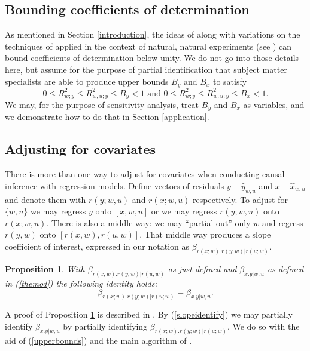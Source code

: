 \documentclass[11pt]{amsart}
\newtheorem{proposition}[theorem]{Proposition}
\begin{document}
\subsection{Bounding coefficients of determination}
As mentioned in Section \ref{introduction}, the ideas of \citep{Gill2014} along with variations on the techniques of \citep{Knaeble2023,Knaeble2024,10.48550/arxiv.2407.19057} applied in the context of natural, natural experiments (see \cite{Rosen}) can bound coefficients of determination below unity. We do not go into those details here, but assume for the purpose of partial identification that subject matter specialists are able to produce upper bounds $B_y$ and $B_x$ to satisfy
\begin{equation}
\label{upperbounds}
0\leq R^2_{w;y}\leq R^2_{w,u;y}\leq B_y<1 \textrm{~and~} 0\leq R^2_{w;y}\leq R^2_{w,u;y}\leq B_x<1.
\end{equation}
We may, for the purpose of sensitivity analysis, treat $B_y$ and $B_x$ as variables, and we demonstrate how to do that in Section \ref{application}.

\subsection{Adjusting for covariates}
There is more than one way to adjust for covariates when conducting causal inference with regression models. Define vectors of residuals $y-\hat{y}_{w,u}$ and $x-\hat{x}_{w,u}$ and denote them with $r(y;w,u)$ and $r(x;w,u)$ respectively. To adjust for $\{w,u\}$ we may regress $y$ onto $[x,w,u]$ or we may regress $r(y;w,u)$ onto $r(x;w,u)$. There is also a middle way: we may ``partial out'' \citep{CohenApplied} only $w$ and regress $r(y,w)$ onto $[r(x,w),r(u,w)]$. That middle way produces a slope coefficient of interest, expressed in our notation as  $\beta_{r(x;w).r(y;w)|r(u;w)}$.
\begin{proposition}
\label{Danny}
With $\beta_{r(x;w).r(y;w)|r(u;w)}$ as just defined and $\beta_{x.y|w,u}$ as defined in (\ref{themod}) the following identity holds:
\begin{equation}\label{slopeidentify}\beta_{r(x;w).r(y;w)|r(u;w)}=\beta_{x.y|w,u}.\end{equation}
\end{proposition}
\noindent A proof of Proposition \ref{Danny} is described in \citep[Proposition 3.1]{KBB}. By (\ref{slopeidentify}) we may partially identify $\beta_{x.y|w,u}$ by partially identifying $\beta_{r(x;w).r(y;w)|r(u;w)}$. We do so with the aid of (\ref{upperbounds}) and the main algorithm of \citep{KOA}. 
\end{document}
